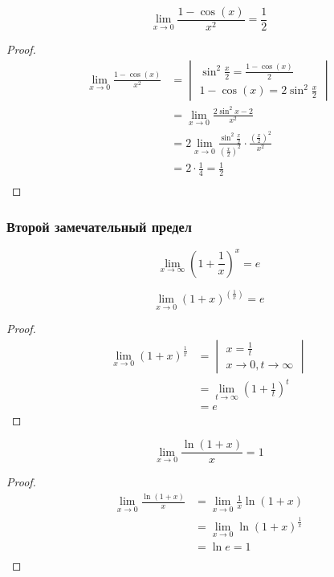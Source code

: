 \begin{corollary}
  \[
  \lim_{x \to 0} \frac{1 - \cos(x)}{x^2} = \frac{1}{2}
  \] 
\end{corollary}
\begin{proof}
  \begin{align*}
    \lim_{x \to 0} \frac{1 - \cos(x)}{x^2} &= 
    \begin{vmatrix}
      \sin^2 \frac{x}{2} = \frac{1 - \cos(x)}{2} \\
      1 - \cos(x) = 2 \sin^2 \frac{x}{2}
    \end{vmatrix}
    \\
    &= \lim_{x \to 0} \frac{2\sin^2 x-2}{x^2} \\
    &= 2 \lim_{x \to 0} \frac{\sin^2 \frac{x}{2}}{(\frac{x}{2})^2} \cdot \frac{(\frac{x}{2})^2}{x^2} \\
    &= 2 \cdot \frac{1}{4} = \frac{1}{2} \\
  \end{align*}
\end{proof}

\subsubsection*{Второй замечательный предел}

\begin{theorem}
  \[
    \boxed{\lim_{x \to \infty} \left(1 + \frac{1}{x}\right)^x = e}
  \] 
\end{theorem}

\begin{corollary}
\[
  \lim_{x \to 0} \left( 1 + x \right)^{\left( \frac{1}{x} \right)} = e
\] 
\end{corollary}
\begin{proof}
  \begin{align*}
    \lim_{x \to 0} (1 + x)^{\frac{1}{x}} &= 
    \begin{vmatrix}
      x = \frac{1}{t} \\
      x \to 0, t \to \infty
    \end{vmatrix} \\
    &= \lim_{t \to \infty} \left( 1 + \frac{1}{t} \right) ^ t \\
    &= e
  \end{align*}
\end{proof}

\begin{corollary}
  \[
    \lim_{x \to 0} \frac{\ln(1 + x)}{x} = 1
  \] 
\end{corollary}
\begin{proof}
  \begin{align*}
    \lim_{x \to 0} \frac{\ln(1 + x)}{x} &= \lim_{x \to 0} \frac{1}{x}\ln(1 + x) \\
      &= \lim_{x \to 0} \ln \left( 1 + x \right) ^ {\frac{1}{x}} \\
      &= \ln e = 1\\
  \end{align*} 
\end{proof}

